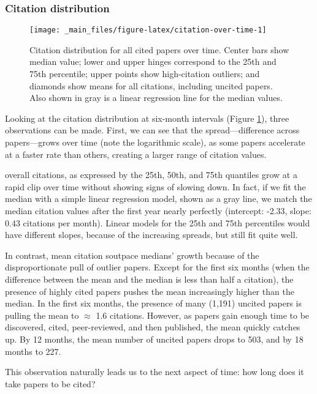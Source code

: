 \documentclass{article}
\begin{document}
\hypertarget{citation-distribution}{%
\subsubsection{Citation distribution}\label{citation-distribution}}

\begin{figure}
\texttt{[image: \_main\_files/figure-latex/citation-over-time-1]} \caption{Citation distribution for all cited papers over time. Center bars show median value; lower and upper hinges correspond to the 25th and 75th percentile; upper points show high-citation outliers; and diamonds show means for all citations, including uncited papers. Also shown in gray is a linear regression line for the median values.}\label{fig:citation-over-time}
\end{figure}

Looking at the citation distribution at six-month intervals (Figure \ref{fig:citation-over-time}), three observations can be made.
First, we can see that the spread---difference across papers---grows over time (note the logarithmic scale), as some papers accelerate at a faster rate than others, creating a larger range of citation values.

overall citations, as expressed by the 25th, 50th, and 75th quantiles grow at a rapid clip over time without showing signs of slowing down.
In fact, if we fit the median with a simple linear regression model, shown as a gray line,
we match the median citation values after the first year nearly perfectly
(intercept: -2.33, slope: 0.43 citations per month).
Linear models for the 25th and 75th percentiles would have different slopes, because of the increasing spreads, but still fit quite well.

In contrast, mean citation soutpace medians' growth because of the disproportionate pull of outlier papers.
Except for the first six months (when the difference between the mean and the median is less than half a citation), the presence of highly cited papers pushes the mean increasingly higher than the median.
In the first six months, the presence of many
(1,191)
uncited papers is pulling the mean to
\(\approx{}\) 1.6
citations.
However, as papers gain enough time to be discovered, cited, peer-reviewed, and then published, the mean quickly catches up.
By 12 months, the mean number of uncited papers drops to
503, and by 18 months to
227.

This observation naturally leads us to the next aspect of time: how long does it take papers to be cited?
\end{document}
